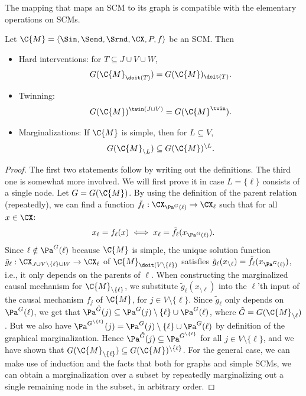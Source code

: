 The mapping that maps an SCM to its graph is compatible with the elementary operations on SCMs.
\begin{Prp}\label{prp:compatibility_graph}
  Let $\C{M} = \langle \Sin, \Send, \Srnd, \CX, P, f \rangle$ be an SCM. Then
  \begin{itemize}
    \item Hard interventions: for $T \subseteq J \cup V \cup W$, 
      $$G(\C{M}_{\doit(T)}) = G(\C{M})_{\doit(T)}.$$
    \item Twinning:
      $$G(\C{M})^{\twin(J\cup V)} = G(\C{M}^\twin).$$
    \item Marginalizations: If $\C{M}$ is simple, then for $L \subseteq V$, 
      $$G(\C{M}_{\setminus L}) \subseteq G(\C{M})^{\setminus L}.$$
  \end{itemize}
\end{Prp}
\begin{proof}
  The first two statements follow by writing out the definitions. The third one is somewhat more involved. We will
  first prove it in case $L = \{\ell\}$ consists of a single node. 
  Let $G = G(\C{M})$.
  By using the definition of the parent relation (repeatedly), we can find a function $\tilde{f}_\ell : \CX_{\Pa^G(\ell)} \to \CX_\ell$ such that
  for all $x \in \CX$:
  $$x_\ell = f_\ell(x) \iff x_\ell = \tilde{f}_\ell(x_{\Pa^G(\ell)}).$$
  Since $\ell \notin \Pa^G(\ell)$ because $\C{M}$ is simple, %
  the unique solution function
  $\tilde{g}_\ell : \CX_{J \cup V \setminus \{\ell\} \cup W} \to \CX_\ell$ of $\C{M}_{\doit(V\setminus \{\ell\})}$
  satisfies $\tilde{g}_\ell(x_{\setminus \ell}) = \tilde{f}_\ell(x_{\Pa^G(\ell)})$, i.e., it only depends on the parents of $\ell$.
  When constructing the marginalized causal mechanism for $\C{M}_{\setminus \{\ell\}}$, we substitute 
  $\tilde{g}_\ell(x_{\setminus \ell})$ into the $\ell$'th input of the causal mechanism $f_j$ of $\C{M}$, for $j \in V\setminus \{\ell\}$.
  Since $\tilde{g}_\ell$ only depends on $\Pa^G(\ell)$,
  we get that $\Pa^{\tilde G}(j) \subseteq \Pa^G(j) \setminus \{\ell\} \cup \Pa^G(\ell)$, where $\tilde{G} = G(\C{M}_{\setminus \ell})$.
  But we also have $\Pa^{G^{\setminus \{\ell\}}}(j) = \Pa^G(j) \setminus \{\ell\} \cup \Pa^G(\ell)$ by definition of the graphical marginalization. 
  Hence $\Pa^{\tilde G}(j) \subseteq \Pa^{G^{\setminus \{\ell\}}}$ for all $j \in V\setminus \{\ell\}$, and we have shown that $G(\C{M}_{\setminus \{\ell\}}) \subseteq G(\C{M})^{\setminus \{\ell\}}$.
  For the general case, we can make use of induction and the facts that both for
  graphs and simple SCMs, we can obtain a marginalization over a subset by repeatedly marginalizing out a single remaining node in the subset, in arbitrary order.
\end{proof}

